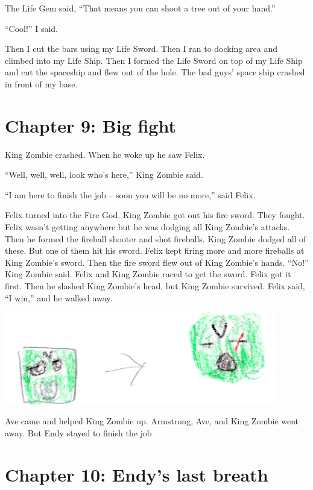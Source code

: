 \documentclass[12pt,oneside]{krantz}
\begin{document}
The Life Gem said, ``That means you can shoot a tree out of your hand.''

``Cool!'' I said.

Then I cut the bars using my Life Sword. Then I ran to docking area and
climbed into my Life Ship. Then I formed the Life Sword on top of my
Life Ship and cut the spaceship and flew out of the hole. The bad guys'
space ship crashed in front of my base.

\hypertarget{chapter-9-big-fight}{%
\chapter*{Chapter 9: Big fight}\label{chapter-9-big-fight}}


King Zombie crashed. When he woke up he saw Felix.

``Well, well, well, look who's here,'' King Zombie said.

``I am here to finish the job -- soon you will be no more,'' said Felix.

Felix turned into the Fire God. King Zombie got out his fire sword. They
fought. Felix wasn't getting anywhere but he was dodging all King
Zombie's attacks. Then he formed the fireball shooter and shot
fireballs. King Zombie dodged all of these. But one of them hit his
sword. Felix kept firing more and more fireballs at King Zombie's sword.
Then the fire sword flew out of King Zombie's hands. ``No!'' King Zombie
said. Felix and King Zombie raced to get the sword. Felix got it first.
Then he slashed King Zombie's head, but King Zombie survived. Felix
said, ``I win,'' and he walked away.

\includegraphics[width=4.6875in,height=\textheight]{img/four-bad-guys/greenheads.jpg}

Ave came and helped King Zombie up. Armstrong, Ave, and King Zombie went
away. But Endy stayed to finish the job

\hypertarget{chapter-10-endys-last-breath}{%
\chapter*{Chapter 10: Endy's last
breath}\label{chapter-10-endys-last-breath}}
\end{document}
